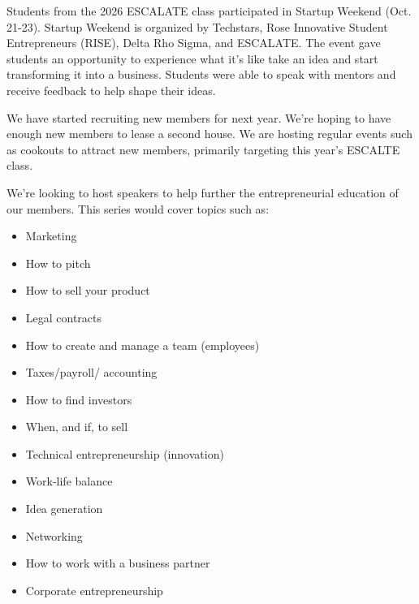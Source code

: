 \documentclass[10pt]{article} %
\begin{document}
\begin{minipage}[t]{.66\linewidth} %


Students from the 2026 ESCALATE class participated in Startup Weekend (Oct. 21-23). Startup Weekend is organized by Techstars, Rose Innovative Student Entrepreneurs (RISE), Delta Rho Sigma, and ESCALATE. The event gave students an opportunity to experience what it's like take an idea and start transforming it into a business. Students were able to speak with mentors and receive feedback to help shape their ideas.



We have started recruiting new members for next year. We're hoping to have enough new members to lease a second house. We are hosting regular events such as cookouts to attract new members, primarily targeting this year's ESCALTE class.

We’re looking to host speakers to help further the entrepreneurial education of our members. This series would cover topics such as:
\begin{itemize}
    \item Marketing
    \item How to pitch
    \item How to sell your product
    \item Legal contracts
    \item How to create and manage a team (employees)
    \item Taxes/payroll/ accounting 
    \item How to find investors
    \item When, and if, to sell
    \item Technical entrepreneurship (innovation)
    \item Work-life balance 
    \item Idea generation
    \item Networking 
    \item How to work with a business partner
    \item Corporate entrepreneurship
\end{itemize}

\end{minipage} %
\end{document}
